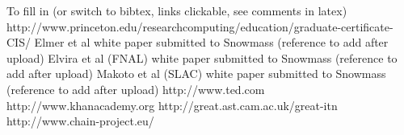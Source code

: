 
\begin{thebibliography}{99}



 To fill in (or switch to bibtex, links clickable, see comments in latex)
 http://www.princeton.edu/researchcomputing/education/graduate-certificate-CIS/
 Elmer et al white paper submitted to Snowmass (reference to add after upload)
 Elvira et al (FNAL) white paper submitted to Snowmass (reference to add after upload)
 Makoto et al (SLAC) white paper submitted to Snowmass (reference to add after upload)
 http://www.ted.com
 http://www.khanacademy.org
 http://great.ast.cam.ac.uk/great-itn
 http://www.chain-project.eu/

\end{thebibliography}
















